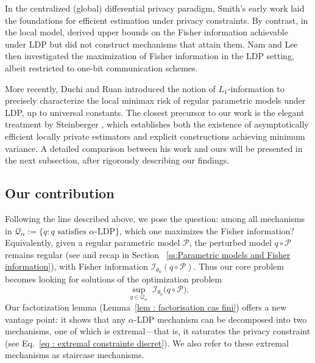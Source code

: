 \documentclass[a4paper, 11pt]{article}
\theoremstyle{definition}
\begin{document}
{In the centralized (global) differential privacy paradigm, Smith’s early work \cite{Smi08, Smi11} laid the foundations for efficient estimation under privacy constraints. By contrast, in the local model, \cite{BarChe20} derived upper bounds on the Fisher information achievable under LDP but did not construct mechanisms that attain them. Nam and Lee \cite{NamLee22} then investigated the maximization of Fisher information in the LDP setting, albeit restricted to one-bit communication schemes.

More recently, Duchi and Ruan \cite{DucRua24} introduced the notion of $L_1$-information to precisely characterize the local minimax risk of regular parametric models under LDP, up to universal constants. The closest precursor to our work is the elegant treatment by Steinberger \cite{steinbergerEfficiencyLocalDifferent}, which establishes both the existence of asymptotically efficient locally private estimators and explicit constructions achieving minimum variance. A detailed comparison between his work and ours will be presented in the next subsection, after rigorously describing our findings.

\subsection{Our contribution}
Following the line described above, we pose the question: among all mechanisms in \(\mathcal{Q}_\alpha:= \{ q : q \text{ satisfies } \alpha\text{-LDP} \}\), which one maximizes the Fisher information?
Equivalently, given a regular parametric model \(\mathcal{P}\), the perturbed model \(q\circ\mathcal{P}\) remains regular (see \cite{steinbergerEfficiencyLocalDifferent} and recap in Section ~\ref{ss:Parametric models and Fisher information}), with Fisher information \(\mathcal{I}_{\theta_0}(q\circ\mathcal{P})\). Thus our core problem becomes looking for solutions of the optimization problem
\begin{equation}\label{eq: max info intro}
\sup_{q\in\mathcal{Q}_\alpha}\; \mathcal{I}_{\theta_0}\bigl(q\circ\mathcal{P}\bigr).
\end{equation}
Our factorization lemma (Lemma~\ref{lem : factorisation cas fini}) offers a new vantage point: it shows that any \(\alpha\)-LDP mechanism can be decomposed into two mechanisms, one of which is extremal—that is, it saturates the privacy constraint (see Eq.~\eqref{eq : extremal constrainte discret}). We also refer to these extremal mechanisms as staircase mechanisms.

}
\end{document}
